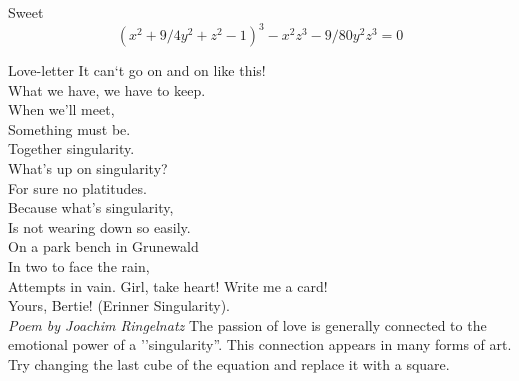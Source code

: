 \begin{surferPage}{Sweet}
\[(x^2+ 9/4y^2	+ z^2- 1)^3- x^2z^3	- 9/80y^2z^3	= 0\]

\singlespacing
Love-letter
\singlespacing
It can`t go on and on like this!\\
What we have, we have to keep.\\
When we'll meet,\\
Something must be.\\
Together singularity.\\
What's up on singularity?\\
For sure no platitudes.\\
Because what's singularity,\\
Is not wearing down so easily.\\
On a park bench in Grunewald\\
In two to face the rain,\\
Attempts in vain. Girl, take heart! Write me a card!\\
Yours, Bertie! (Erinner Singularity).\\
{\it Poem by Joachim Ringelnatz}
\singlespacing
The passion of love is generally connected to the emotional power of a ''singularity''. This connection appears in many forms of art.
\singlespacing
Try changing the last cube of the equation and replace it with a square.
\end{surferPage}
